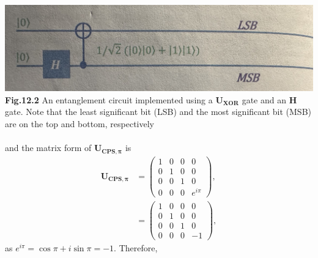 \documentclass{article}
\begin{document}
\includegraphics[scale=0.4]{Fig.12.2.jpeg}\\
\textbf{Fig.12.2} An entanglement circuit implemented  using a $\boldsymbol{U_{XOR}}$ gate and an $\boldsymbol{H}$ gate.
Note that the least significant bit (LSB) and the most significant bit (MSB) are on the top and bottom, respectively
\\\\
and the matrix form of $\boldsymbol{U_{CPS,\pi}}$ is
\begin{align*}\label{eq 12.4}
  \boldsymbol{U_{CPS,\pi}}&=\begin{pmatrix}
    1&0&0&0\\0&1&0&0\\0&0&1&0\\0&0&0&e^{i\pi}
  \end{pmatrix},\\
  &= \begin{pmatrix}
    1&0&0&0\\0&1&0&0\\0&0&1&0\\0&0&0&-1
  \end{pmatrix},\tag{12.4}
\end{align*}
as $e^{i\pi}=\cos\pi+i\sin\pi=-1$. Therefore,
\end{document}
